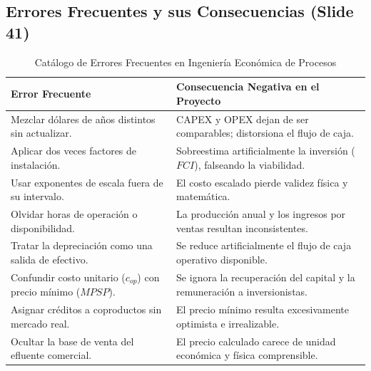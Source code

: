 \documentclass[11pt,letterpaper]{article}
\begin{document}
\subsection{Errores Frecuentes y sus Consecuencias (Slide 41)}
\begin{table}[htbp]
    \centering
    \small
    \caption{Catálogo de Errores Frecuentes en Ingeniería Económica de Procesos}
    \begin{tabularx}{\textwidth}{l X}
        \toprule
        \rowcolor{tableheader}
        \textbf{\color{white}Error Frecuente} & \textbf{\color{white}Consecuencia Negativa en el Proyecto} \\
        \midrule
        Mezclar dólares de años distintos sin actualizar. & CAPEX y OPEX dejan de ser comparables; distorsiona el flujo de caja. \\
        \rowcolor{tablerowgray}
        Aplicar dos veces factores de instalación. & Sobreestima artificialmente la inversión ($FCI$), falseando la viabilidad. \\
        Usar exponentes de escala fuera de su intervalo. & El costo escalado pierde validez física y matemática. \\
        \rowcolor{tablerowgray}
        Olvidar horas de operación o disponibilidad. & La producción anual y los ingresos por ventas resultan inconsistentes. \\
        Tratar la depreciación como una salida de efectivo. & Se reduce artificialmente el flujo de caja operativo disponible. \\
        \rowcolor{tablerowgray}
        Confundir costo unitario ($c_{op}$) con precio mínimo ($MPSP$). & Se ignora la recuperación del capital y la remuneración a inversionistas. \\
        Asignar créditos a coproductos sin mercado real. & El precio mínimo resulta excesivamente optimista e irrealizable. \\
        \rowcolor{tablerowgray}
        Ocultar la base de venta del efluente comercial. & El precio calculado carece de unidad económica y física comprensible. \\
        \bottomrule
    \end{tabularx}
\end{table}
\end{document}
